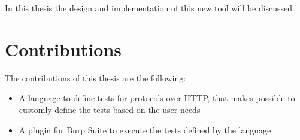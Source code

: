 In this thesis the design and implementation of this new tool will be discussed.

\section{Contributions}
The contributions of this thesis are the following:
\begin{itemize}
    \item A language to define tests for protocols over HTTP, that makes possible to customly define the tests based on the user needs
    \item A plugin for Burp Suite to execute the tests defined by the language
\end{itemize}





